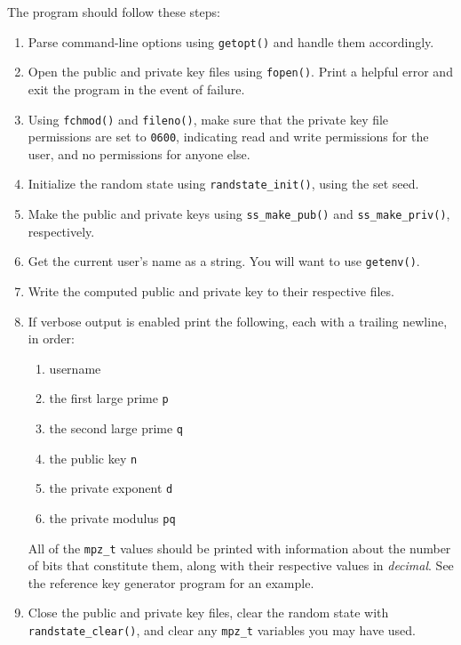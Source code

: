 The program should follow these steps:
\begin{enumerate}
  \item Parse command-line options using \texttt{getopt()} and handle
    them accordingly.
  \item Open the public and private key files using \texttt{fopen()}.
    Print a helpful error and exit the program in the event of failure.
  \item Using \texttt{fchmod()} and \texttt{fileno()}, make sure that
    the private key file permissions are set to \texttt{0600},
    indicating read and write permissions for the user, and no
    permissions for anyone else.
  \item Initialize the random state using \texttt{randstate\_init()},
    using the set seed.
  \item Make the public and private keys using \texttt{ss\_make\_pub()}
    and \texttt{ss\_make\_priv()}, respectively.
  \item Get the current user's name as a string. You will want to use
    \texttt{getenv()}.
  \item Write the computed public and private key to their respective
    files.
  \item If verbose output is enabled print the following, each with a
    trailing newline, in order:
    \begin{enumerate}
      \item username
      \item the first large prime \texttt{p}
      \item the second large prime \texttt{q}
      \item the public key \texttt{n}
      \item the private exponent \texttt{d}
      \item the private modulus \texttt{pq}
    \end{enumerate}
    All of the \texttt{mpz\_t} values should be printed with information
    about the number of bits that constitute them, along with their
    respective values in \emph{decimal}. See the reference key generator
    program for an example.
  \item Close the public and private key files, clear the random state
    with \texttt{randstate\_clear()}, and clear any \texttt{mpz\_t}
    variables you may have used.
\end{enumerate}
